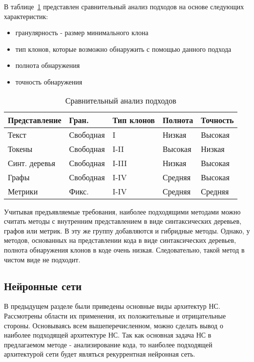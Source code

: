 В таблице~\ref{compare} представлен сравнительный анализ подходов на основе следующих характеристик:
\begin{itemize}
\setlength\itemsep{0mm}
\item гранулярность - размер минимального клона
\item тип клонов, которые возможно обнаружить с помощью данного подхода
\item полнота обнаружения
\item точность обнаружения
\end{itemize}

\begin{table}[H]
\centering
\captionsetup{skip=5pt}
\caption{Сравнительный анализ подходов}
\label{compare}
\begin{tabular}{|l|l|l|l|l|}
\hline
Представление    & Гран.		& Тип клонов & Полнота	& Точность \\ \hline
Текст            & Свободная    & I          & Низкая  	& Высокая  \\ \hline
Токены           & Свободная    & I-II       & Высокая 	& Низкая   \\ \hline
Синт. деревья	 & Свободная    & I-III      & Низкая  	& Высокая  \\ \hline
Графы            & Свободная    & I-IV       & Средняя 	& Высокая  \\ \hline
Метрики          & Фикс.		& I-IV       & Средняя 	& Средняя  \\ \hline
\end{tabular}
\end{table}

Учитывая предъявляемые требования, наиболее подходящими методами можно считать методы с внутренним представлением в виде синтаксических деревьев, графов или метрик. В эту же группу добавляются и гибридные методы. Однако, у методов, основанных на представлении кода в виде синтаксических деревьев, полнота обнаружения клонов в коде очень низкая. Следовательно, такой метод в чистом виде не подходит.

\subsection{Нейронные сети}

В предыдущем разделе были приведены основные виды архитектур НС. Рассмотрены области их применения, их положительные и отрицательные стороны. Основываясь всем вышеперечисленном, можно сделать вывод о наиболее подходящей архитектуре НС. Так как основная задача НС в предлагаемом методе - анализирование кода, то наиболее подходящей архитектурой сети будет являться рекуррентная нейронная сеть.
